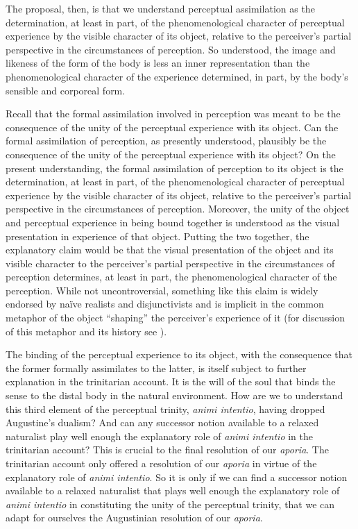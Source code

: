 \documentclass[12pt]{article}
\begin{document}
The proposal, then, is that we understand perceptual assimilation as the determination, at least in part, of the phenomenological character of perceptual experience by the visible character of its object, relative to the perceiver's partial perspective in the circumstances of perception. So understood, the image and likeness of the form of the body is less an inner representation than the phenomenological character of the experience determined, in part, by the body's sensible and corporeal form.

Recall that the formal assimilation involved in perception was meant to be the consequence of the unity of the perceptual experience with its object. Can the formal assimilation of perception, as presently understood, plausibly be the consequence of the unity of the perceptual experience with its object? On the present understanding, the formal assimilation of perception to its object is the determination, at least in part, of the phenomenological character of perceptual experience by the visible character of its object, relative to the perceiver's partial perspective in the circumstances of perception. Moreover, the unity of the object and perceptual experience in being bound together is understood as the visual presentation in experience of that object. Putting the two together, the explanatory claim would be that the visual presentation of the object and its visible character to the perceiver's partial perspective in the circumstances of perception determines, at least in part, the phenomenological character of the perception. While not uncontroversial, something like this claim is widely endorsed by na\"{i}ve realists and disjunctivists and is implicit in the common metaphor of the object ``shaping'' the perceiver's experience of it (for discussion of this metaphor and its history see \citealt[chapter 9]{Kalderon:2015fr}).

The binding of the perceptual experience to its object, with the consequence that the former formally assimilates to the latter, is itself subject to further explanation in the trinitarian account. It is the will of the soul that binds the sense to the distal body in the natural environment. How are we to understand this third element of the perceptual trinity, \emph{animi intentio}, having dropped Augustine's dualism? And can any successor notion available to a relaxed naturalist play well enough the explanatory role of \emph{animi intentio} in the trinitarian account? This is crucial to the final resolution of our \emph{aporia}. The trinitarian account only offered a resolution of our \emph{aporia} in virtue of the explanatory role of \emph{animi intentio}. So it is only if we can find a successor notion available to a relaxed naturalist that plays well enough the explanatory role of \emph{animi intentio} in constituting the unity of the perceptual trinity, that we can adapt for ourselves the Augustinian resolution of our \emph{aporia}.
\end{document}
